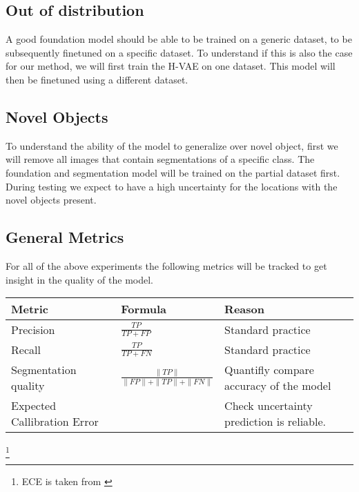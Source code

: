 \subsection*{Out of distribution}
A good foundation model should be able to be trained on a generic dataset, to be subsequently finetuned on a specific dataset. To understand if this is also the case for our method, we will first train the H-VAE on one dataset. This model will then be finetuned using a different dataset.

\subsection*{Novel Objects}
To understand the ability of the model to generalize over novel object, first we will remove all images that contain segmentations of a specific class. The foundation and segmentation model will be trained on the partial dataset first. During testing we expect to have a high uncertainty for the locations with the novel objects present.

\subsection*{General Metrics}
For all of the above experiments the following metrics will be tracked to get insight in the quality of the model.

\begin{table}[]
    \begin{tabular}{l|l|l}
        Metric                      & Formula                                   & Reason                                     \\
        \hline
        Precision                   & $\frac{TP}{TP + FP}$                      & Standard practice                          \\
        Recall                      & $\frac{TP}{TP + FN}$                      & Standard practice                          \\
        Segmentation quality        & $\frac{\|TP\|}{\|FP\| + \|TP\| + \|FN\|}$ & Quantifly compare accuracy of the model    \\
        Expected Callibration Error &                                           & Check uncertainty prediction is reliable.
    \end{tabular}
\end{table}

\footnote[1]{ECE is taken from \cite{guo2017calibration}}
